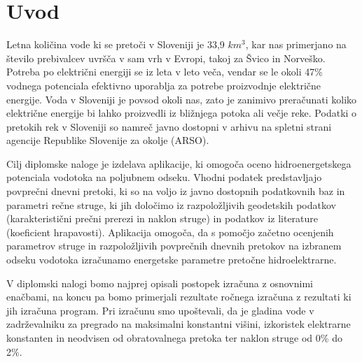 
\chapter{Uvod}\label{sec: Uvod}
\thispagestyle{fancy}


Letna količina vode ki se pretoči v Sloveniji je 33,9 $km^{3}$, kar nas primerjano na število prebivalcev uvršča v sam vrh v Evropi, takoj za Švico in Norveško. Potreba po električni energiji se iz leta v leto veča, vendar se le okoli 47\% vodnega potenciala efektivno uporablja za potrebe proizvodnje električne energije. Voda v Sloveniji je povsod okoli nas, zato je zanimivo preračunati koliko električne energije bi lahko proizvedli iz bližnjega potoka ali večje reke. Podatki o pretokih rek v Sloveniji so namreč javno dostopni v arhivu na spletni strani agencije Republike Slovenije za okolje (ARSO). \cite{HEnaSrednjiSavi}


Cilj diplomske naloge je izdelava aplikacije, ki omogoča oceno hidroenergetskega potenciala vodotoka na poljubnem odseku. Vhodni podatek predstavljajo povprečni dnevni pretoki, ki so na voljo iz javno dostopnih podatkovnih baz in parametri rečne struge, ki jih določimo iz razpoložljivih geodetskih podatkov (karakteristični prečni prerezi in naklon struge) in podatkov iz literature (koeficient hrapavosti). Aplikacija omogoča, da s pomočjo začetno ocenjenih parametrov struge in razpoložljivih povprečnih dnevnih pretokov na izbranem odseku vodotoka izračunamo energetske parametre pretočne hidroelektrarne.


V diplomski nalogi bomo najprej opisali postopek izračuna z osnovnimi enačbami, na koncu pa bomo primerjali rezultate ročnega izračuna z rezultati ki jih izračuna program. Pri izračunu smo upoštevali, da je gladina vode v zadrževalniku za pregrado na maksimalni konstantni višini, izkoristek elektrarne konstanten in neodvisen od obratovalnega pretoka ter naklon struge od 0\% do 2\%.



